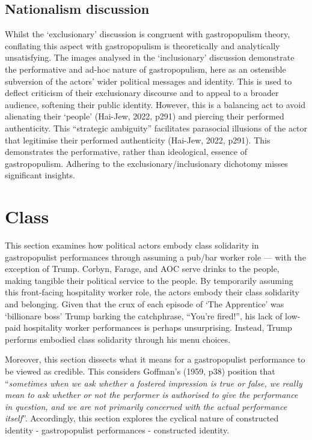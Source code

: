 \documentclass[a4paper, nobind]{templates/ociamthesis}
\begin{document}
\hypertarget{nationalism-discussion}{%
\subsection*{Nationalism discussion}\label{nationalism-discussion}}

Whilst the `exclusionary' discussion is congruent with gastropopulism theory, conflating this aspect with gastropopulism is theoretically and analytically unsatisfying.
The images analysed in the `inclusionary' discussion demonstrate the performative and ad-hoc nature of gastropopulism, here as an ostensible subversion of the actors' wider political messages and identity.
This is used to deflect criticism of their exclusionary discourse and to appeal to a broader audience, softening their public identity.
However, this is a balancing act to avoid alienating their `people' (Hai-Jew, 2022, p291) and piercing their performed authenticity.
This ``strategic ambiguity'' facilitates parasocial illusions of the actor that legitimise their performed authenticity (Hai-Jew, 2022, p291).
This demonstrates the performative, rather than ideological, essence of gastropopulism. Adhering to the exclusionary/inclusionary dichotomy misses significant insights.

\hypertarget{class}{%
\section{Class}\label{class}}

This section examines how political actors embody class solidarity in gastropopulist performances through assuming a pub/bar worker role --- with the exception of Trump. Corbyn, Farage, and AOC serve drinks to the people, making tangible their political service to the people. By temporarily assuming this front-facing hospitality worker role, the actors embody their class solidarity and belonging. Given that the crux of each episode of `The Apprentice' was `billionare boss' Trump barking the catchphrase, ``You're fired!'', his lack of low-paid hospitality worker performances is perhaps unsurprising. Instead, Trump performs embodied class solidarity through his menu choices.

Moreover, this section dissects what it means for a gastropopulist performance to be viewed as credible. This considers Goffman's (1959, p38) position that ``\emph{sometimes when we ask whether a fostered impression is true or false, we really mean to ask whether or not the performer is authorised to give the performance in question, and we are not primarily concerned with the actual performance itself}''. Accordingly, this section explores the cyclical nature of constructed identity - gastropopulist performances - constructed identity.
\end{document}
